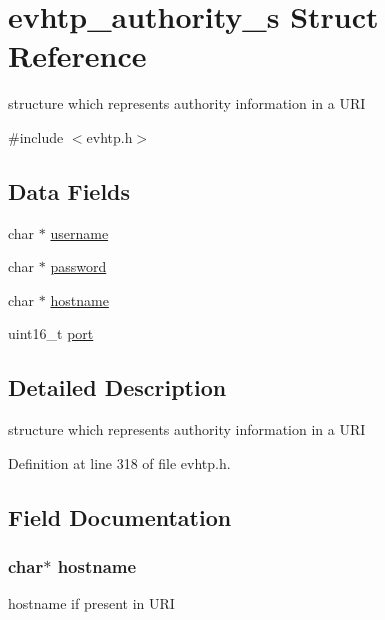 \hypertarget{structevhtp__authority__s}{
\section{evhtp\_\-authority\_\-s Struct Reference}
\label{structevhtp__authority__s}
}


structure which represents authority information in a URI  




{\ttfamily \#include $<$evhtp.h$>$}

\subsection*{Data Fields}
\begin{DoxyCompactItemize}
\item 
char $\ast$ \hyperlink{structevhtp__authority__s_a9b20c006bd90a09e1465fb668700e81d}{username}
\item 
char $\ast$ \hyperlink{structevhtp__authority__s_a59460a3ff2c12443d1022e5cc0fba85c}{password}
\item 
char $\ast$ \hyperlink{structevhtp__authority__s_af203df082d5c6dcaa0c88b07cf86466d}{hostname}
\item 
uint16\_\-t \hyperlink{structevhtp__authority__s_a8e0798404bf2cf5dabb84c5ba9a4f236}{port}
\end{DoxyCompactItemize}


\subsection{Detailed Description}
structure which represents authority information in a URI 

Definition at line 318 of file evhtp.h.



\subsection{Field Documentation}
\hypertarget{structevhtp__authority__s_af203df082d5c6dcaa0c88b07cf86466d}{
\subsubsection[{hostname}]{\setlength{\rightskip}{0pt plus 5cm}char$\ast$ {\bf hostname}}}
\label{structevhtp__authority__s_af203df082d5c6dcaa0c88b07cf86466d}
hostname if present in URI 

